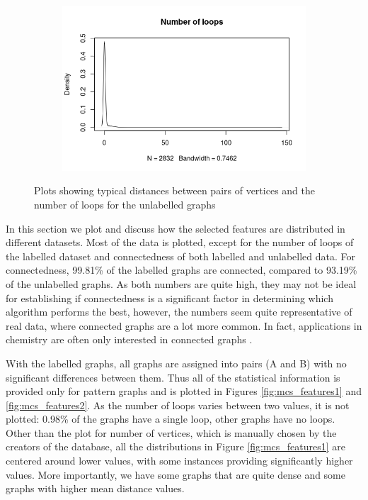 \documentclass{article}
\theoremstyle{definition}
\theoremstyle{remark}
\begin{document}
\begin{figure}
\begin{subfigure}[t]{0.49\textwidth}
  \end{subfigure}
  \begin{subfigure}[t]{0.49\textwidth}
    \centering
    \includegraphics[width=\textwidth]{sip_loops.png}
  \end{subfigure}
  \caption{Plots showing typical distances between pairs of vertices and the
    number of loops for the unlabelled graphs}
  \label{fig:sip_features2}
\end{figure}

In this section we plot and discuss how the selected features are distributed in
different datasets. Most of the data is plotted, except for the number of loops
of the labelled dataset and connectedness of both labelled and unlabelled data.
For connectedness, 99.81\% of the labelled graphs are connected, compared to
93.19\% of the unlabelled graphs. As both numbers are quite high, they may not
be ideal for establishing if connectedness is a significant factor in
determining which algorithm performs the best, however, the numbers seem quite
representative of real data, where connected graphs are a lot more common. In
fact, applications in chemistry are often only interested in connected graphs
\cite{WCMS:WCMS5}.

With the labelled graphs, all graphs are assigned into pairs (A and B) with no
significant differences between them. Thus all of the statistical information is
provided only for pattern graphs and is plotted in Figures
\ref{fig:mcs_features1} and \ref{fig:mcs_features2}. As the number of loops
varies between two values, it is not plotted: 0.98\% of the graphs have a
single loop, other graphs have no loops. Other than the plot for number of
vertices, which is manually chosen by the creators of the database, all the
distributions in Figure \ref{fig:mcs_features1} are centered around lower
values, with some instances providing significantly higher values. More
importantly, we have some graphs that are quite dense and some graphs with
higher mean distance values.
\end{document}
